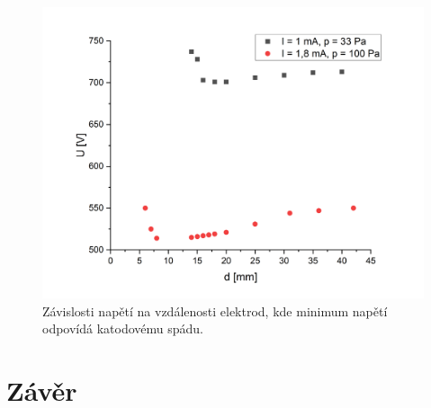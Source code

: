 \documentclass[a4paper,12pt]{article}
\begin{document}
\begin{figure}[h]
	\centering
	\includegraphics[width=130mm]{KatodovySpad.png}
	\caption{Závislosti napětí na vzdálenosti elektrod, kde minimum napětí odpovídá katodovému spádu.}
	\label{KatodovySpad}
\end{figure}

\section{Závěr}
\end{document}
